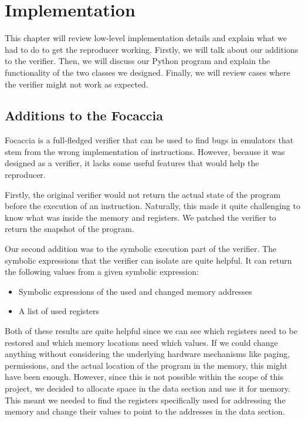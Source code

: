 
\chapter{Implementation}\label{chapter:implementation}
This chapter will review low-level implementation details and explain what we had to do to get the reproducer working.
Firstly, we will talk about our additions to the verifier.
Then, we will discuss our Python program and explain the functionality of the two classes we designed.
Finally, we will review cases where the verifier might not work as expected.

\section{Additions to the Focaccia}
Focaccia is a full-fledged verifier that can be used to find bugs in emulators that stem from the wrong implementation of instructions.
However, because it was designed as a verifier, it lacks some useful features that would help the reproducer.

Firstly, the original verifier would not return the actual state of the program before the execution of an instruction.
Naturally, this made it quite challenging to know what was inside the memory and registers.
We patched the verifier to return the snapshot of the program.

Our second addition was to the symbolic execution part of the verifier.
The symbolic expressions that the verifier can isolate are quite helpful.
It can return the following values from a given symbolic expression:
\begin{itemize}
    \item Symbolic expressions of the used and changed memory addresses
    \item A list of used registers
\end{itemize}
Both of these results are quite helpful since we can see which registers need to be restored and which memory locations need which values.
If we could change anything without considering the underlying hardware mechanisms like paging, permissions, and the actual location of the program in the memory, this might have been enough.
However, since this is not possible within the scope of this project, we decided to allocate space in the data section and use it for memory.
This meant we needed to find the registers specifically used for addressing the memory and change their values to point to the addresses in the data section.

